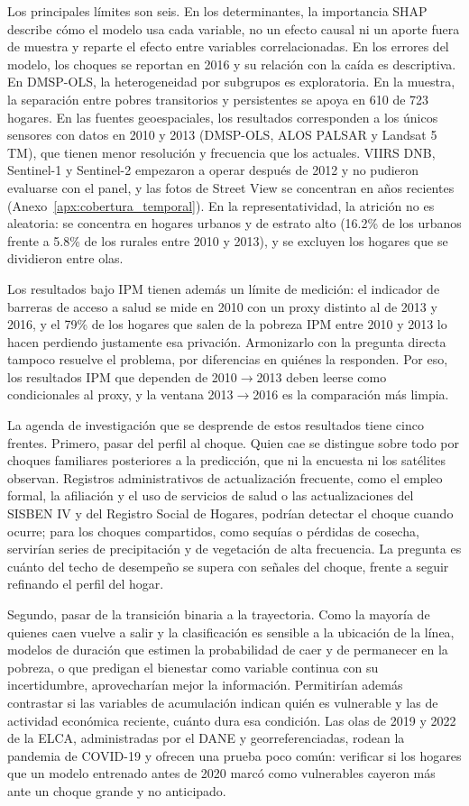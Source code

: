 \documentclass[12pt, letterpaper]{article}
\begin{document}
Los principales límites son seis. En los determinantes, la importancia
SHAP describe cómo el modelo usa cada variable, no un efecto causal ni un
aporte fuera de muestra y reparte el efecto entre variables
correlacionadas. En los errores del modelo, los choques se reportan
en 2016 y su relación con la caída es descriptiva. En DMSP-OLS, la
heterogeneidad por subgrupos es exploratoria. En la
muestra, la separación entre pobres transitorios y persistentes se apoya
en 610 de 723 hogares. En las fuentes geoespaciales, los resultados
corresponden a los únicos sensores con datos en 2010 y 2013 (DMSP-OLS,
ALOS PALSAR y Landsat 5 TM), que tienen menor resolución y frecuencia que
los actuales. VIIRS DNB, Sentinel-1 y Sentinel-2 empezaron a operar
después de 2012 y no pudieron evaluarse con el panel, y las fotos de
Street View se concentran en años recientes
(Anexo~\ref{apx:cobertura_temporal}). En la representatividad, la atrición no es
aleatoria: se concentra en hogares urbanos y de estrato alto (16.2\% de los
urbanos frente a 5.8\% de los rurales entre 2010 y 2013), y se excluyen los
hogares que se dividieron entre olas.

Los resultados bajo IPM tienen además un límite de medición: el indicador
de barreras de acceso a salud se mide en 2010 con un proxy distinto al de
2013 y 2016, y el 79\% de los hogares que salen de la pobreza IPM entre
2010 y 2013 lo hacen perdiendo justamente esa privación. Armonizarlo con
la pregunta directa tampoco resuelve el problema, por diferencias en
quiénes la responden. Por eso, los resultados IPM que dependen de
2010$\to$2013 deben leerse como condicionales al proxy, y la ventana
2013$\to$2016 es la comparación más limpia.

La agenda de investigación que se desprende de estos resultados tiene cinco
frentes. Primero, pasar del perfil al choque. Quien cae se distingue sobre
todo por choques familiares posteriores a la predicción, que ni la encuesta
ni los satélites observan. Registros administrativos de actualización
frecuente, como el empleo formal, la afiliación y el uso de servicios de
salud o las actualizaciones del SISBEN IV y del Registro Social de Hogares,
podrían detectar el choque cuando ocurre; para los choques compartidos,
como sequías o pérdidas de cosecha, servirían series de precipitación y de
vegetación de alta frecuencia. La pregunta es cuánto del techo de
desempeño se supera con señales del choque, frente a seguir refinando el
perfil del hogar.

Segundo, pasar de la transición binaria a la trayectoria. Como la mayoría
de quienes caen vuelve a salir y la clasificación es sensible a la
ubicación de la línea, modelos de duración que estimen la probabilidad de
caer y de permanecer en la pobreza, o que predigan el bienestar como
variable continua con su incertidumbre, aprovecharían mejor la
información. Permitirían además contrastar si las variables de
acumulación indican quién es vulnerable y las de actividad económica
reciente, cuánto dura esa condición. Las olas de 2019 y 2022 de la ELCA,
administradas por el DANE y georreferenciadas, rodean la pandemia de
COVID-19 y ofrecen una prueba poco común: verificar si los hogares que un
modelo entrenado antes de 2020 marcó como vulnerables cayeron más ante un
choque grande y no anticipado.
\end{document}
